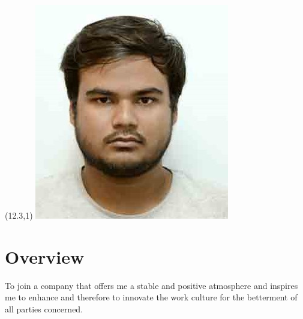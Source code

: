 \documentclass[11pt,a4paper]{moderncv}
\begin{document}
\hskip-2.5cm 
\makecvtitle
\begin{textblock}{0}(12.3,1)
\includegraphics[scale=0.35]{Sub}
\end{textblock}

\section{Overview}
To join a company that offers me a stable and positive atmosphere and inspires me to enhance and therefore to innovate the work culture for the betterment of all parties concerned.

%
%
%	
%	
%	
%	
\end{document}
